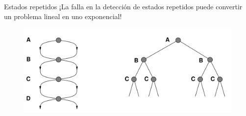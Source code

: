 \documentclass{beamer}
\theoremstyle{definition}
\theoremstyle{theorem}
\theoremstyle{remark}
\begin{document}
\begin{frame}{Estados repetidos}
¡La falla en la detección de estados repetidos puede convertir un problema lineal en
uno exponencial!

    \begin{figure}
        \includegraphics[scale=0.25]{72_chap3_pag72.png}
    \end{figure}
\end{frame}{}
\end{document}
